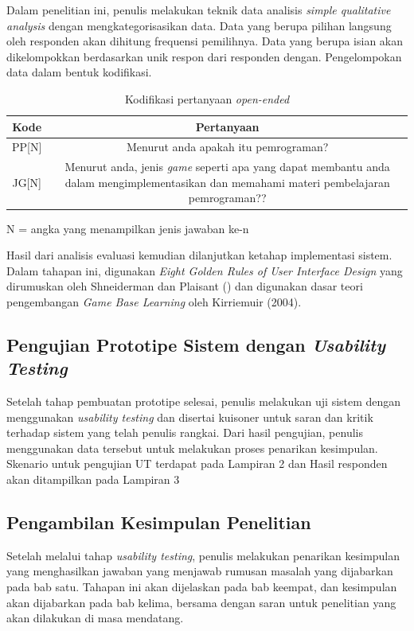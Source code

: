 	Dalam penelitian ini, penulis melakukan teknik data analisis \textit{simple qualitative analysis} dengan mengkategorisasikan data. Data yang berupa pilihan langsung oleh responden akan dihitung frequensi pemilihnya. Data yang berupa isian akan dikelompokkan berdasarkan unik respon dari responden dengan. Pengelompokan data dalam bentuk kodifikasi.
	\begin{table}
		\centering
		\caption{Kodifikasi pertanyaan \textit{open-ended}}
		\label{tab:tab1}
		\begin{tabular}{| c | c |}
			\hline
			Kode & Pertanyaan \\
			\hline
			PP[N] & \multicolumn{1}{p{10cm}|}{Menurut anda apakah itu pemrograman?}\\ \hline
			JG[N] & \multicolumn{1}{p{10cm}|}{Menurut anda, jenis \textit{game} seperti apa yang dapat membantu anda dalam mengimplementasikan dan memahami materi pembelajaran pemrograman??} \\ \hline
		\end{tabular}
		\vspace{1ex}
		
		\raggedright \small{N = angka yang menampilkan jenis jawaban ke-n}
	\end{table}
	Hasil dari analisis evaluasi kemudian dilanjutkan ketahap implementasi sistem. Dalam tahapan ini, digunakan \textit{Eight Golden Rules of User Interface Design} yang dirumuskan oleh Shneiderman dan Plaisant (\citeyear{papper.shneiderman}) dan digunakan dasar teori pengembangan \textit{Game Base Learning} oleh Kirriemuir (2004).
	
	\subsection{Pengujian Prototipe Sistem dengan \textit{Usability Testing}}
	
	Setelah tahap pembuatan prototipe selesai, penulis melakukan uji sistem dengan menggunakan \textit{usability testing} dan disertai kuisoner untuk saran dan kritik terhadap sistem yang telah penulis rangkai. Dari hasil pengujian, penulis menggunakan data tersebut untuk melakukan proses penarikan kesimpulan. Skenario untuk pengujian UT terdapat pada Lampiran 2 dan Hasil responden akan ditampilkan pada Lampiran 3
	
	\subsection{Pengambilan Kesimpulan Penelitian}
	
	Setelah melalui tahap \textit{usability testing}, penulis melakukan penarikan kesimpulan yang menghasilkan jawaban yang menjawab rumusan masalah yang dijabarkan pada bab satu. Tahapan ini akan dijelaskan pada bab keempat, dan kesimpulan akan dijabarkan pada bab kelima, bersama dengan saran untuk penelitian yang akan dilakukan di masa mendatang.
	

